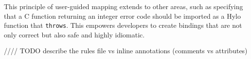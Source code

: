 This principle of user-guided mapping extends to other areas, such as specifying that a C function returning an integer error code should be imported as a Hylo function that \texttt{throws}. This empowers developers to create bindings that are not only correct but also safe and highly idiomatic.

//// TODO describe the rules file vs inline annotations (comments vs attributes)
